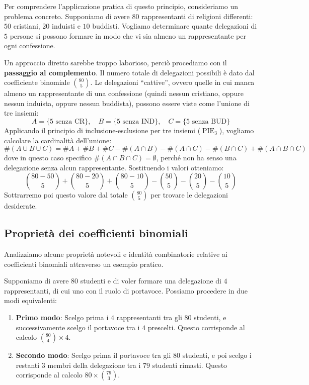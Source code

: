 \documentclass[12pt]{report}
\begin{document}
	Per comprendere l'applicazione pratica di questo principio, consideriamo un problema concreto.
	Supponiamo di avere $80$ rappresentanti di religioni differenti: $50$ cristiani, $20$ induisti e $10$ buddisti. Vogliamo determinare quante delegazioni di $5$ persone si possono formare in modo che vi sia almeno un rappresentante per ogni confessione.
	
	Un approccio diretto sarebbe troppo laborioso, perciò procediamo con il \textbf{passaggio al complemento}. Il numero totale di delegazioni possibili è dato dal coefficiente binomiale $\binom{80}{5}$. Le delegazioni ``cattive'', ovvero quelle in cui manca almeno un rappresentante di una confessione (quindi nessun cristiano, oppure nessun induista, oppure nessun buddista), possono essere viste come l'unione di tre insiemi:
	\[
	A = \{5 \text{ senza CR}\}, \quad B = \{5 \text{ senza IND}\}, \quad C = \{5 \text{ senza BUD}\}
	\]
	Applicando il principio di inclusione-esclusione per tre insiemi ($\operatorname{PIE}_3$), vogliamo calcolare la cardinalità dell'unione:
	\[
	\#(A \cup B \cup C) = \#A + \#B + \#C - \#(A \cap B) - \#(A \cap C) - \#(B \cap C) + \#(A \cap B \cap C)
	\]
	dove in questo caso specifico $\#(A \cap B \cap C) = \emptyset$, perché non ha senso una delegazione senza alcun rappresentante.
	Sostituendo i valori otteniamo:
	\[
	\binom{80-50}{5} + \binom{80-20}{5} + \binom{80-10}{5} - \binom{50}{5} - \binom{20}{5} - \binom{10}{5}
	\]
	Sottrarremo poi questo valore dal totale $\binom{80}{5}$ per trovare le delegazioni desiderate.
	
	\subsection{Proprietà dei coefficienti binomiali}
	
	Analizziamo alcune proprietà notevoli e identità combinatorie relative ai coefficienti binomiali attraverso un esempio pratico.
	
	Supponiamo di avere $80$ studenti e di voler formare una delegazione di $4$ rappresentanti, di cui uno con il ruolo di portavoce. Possiamo procedere in due modi equivalenti:
	
	\begin{enumerate}
		
		\item \textbf{Primo modo}: Scelgo prima i $4$ rappresentanti tra gli $80$ studenti, e successivamente scelgo il portavoce tra i $4$ prescelti. Questo corrisponde al calcolo $\binom{80}{4} \times 4$.
		
		\item \textbf{Secondo modo}: Scelgo prima il portavoce tra gli $80$ studenti, e poi scelgo i restanti $3$ membri della delegazione tra i $79$ studenti rimasti. Questo corrisponde al calcolo $80 \times \binom{79}{3}$.
		
	\end{enumerate}
	
\end{document}
